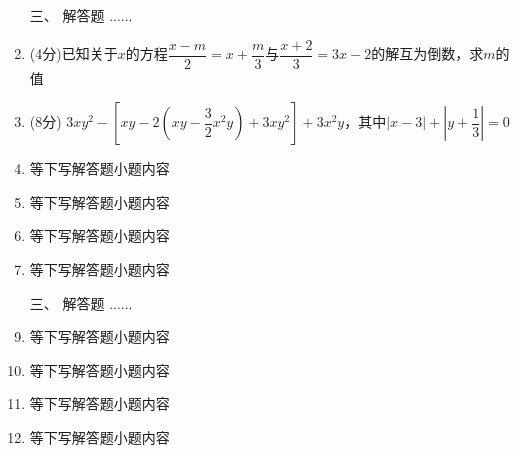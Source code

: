 \documentclass[12pt,landscape,UTF8,onecolumn]{ctexart}
\begin{document}
\begin{spacing}{1.3}
\begin{enumerate} [1、]
      \item[\heiti 三、] {\heiti 解答题  ......}
      \item (4分)已知关于$x$的方程$\dfrac {x-m}2=x+\dfrac m3$与$\dfrac {x+2}3=3x-2$的解互为倒数，求$m$的值
      \item (8分) $3xy^2-[xy-2(xy-\dfrac32x^2y)+3xy^2]+3x^2y$，其中$|x-3|+|y+\dfrac 13|=0$
      \item 等下写解答题小题内容 
      \item 等下写解答题小题内容 
      \item 等下写解答题小题内容 
      \item 等下写解答题小题内容 
      \item[\heiti 三、] {\heiti 解答题  ......}
      \item 等下写解答题小题内容 
      \item 等下写解答题小题内容 
      \item 等下写解答题小题内容 
      \item 等下写解答题小题内容 
    \end{enumerate} 
  \end{spacing}
\end{document}

